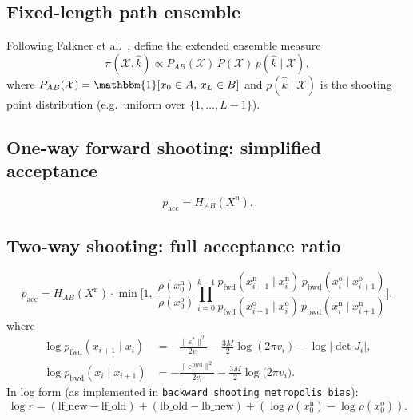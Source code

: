 \documentclass[11pt,a4paper]{article}
\newcommand{\HAB}{H_{AB}}
\newcommand{\pacc}{p_{\mathrm{acc}}}
\newcommand{\pfwd}{p_{\mathrm{fwd}}}
\newcommand{\pbwd}{p_{\mathrm{bwd}}}
\newcommand{\Xnew}{X^{\mathrm{n}}}
\begin{document}
\subsection{Fixed-length path ensemble}

Following Falkner et al.~\cite{falkner2023}, define the extended
ensemble measure
\begin{equation}
  \pi(\mathcal{X}, \hat k)
  \propto
  P_{AB}(\mathcal{X})\,P(\mathcal{X})\,p(\hat k \mid \mathcal{X}),
\end{equation}
where $P_{AB}(\mathcal{X}) = \mathbbm{1}[x_0 \in A,\, x_L \in B]$ and
$p(\hat k \mid \mathcal{X})$ is the shooting point distribution
(e.g.\ uniform over $\{1,\ldots,L-1\}$).

\subsection{One-way forward shooting: simplified acceptance}

\begin{equation}
  \pacc = \HAB(\Xnew).
  \label{eq:oneway-acceptance}
\end{equation}

\subsection{Two-way shooting: full acceptance ratio}

\begin{equation}
  \pacc = \HAB(\Xnew)\cdot
  \min\!\Biggl[1,\;
    \frac{\rho(x_0^{\mathrm{n}})}{\rho(x_0^{\mathrm{o}})}
    \prod_{i=0}^{k-1}
    \frac{\pfwd(x_{i+1}^{\mathrm{n}} \mid x_i^{\mathrm{n}})\,
          \pbwd(x_i^{\mathrm{o}} \mid x_{i+1}^{\mathrm{o}})}
         {\pfwd(x_{i+1}^{\mathrm{o}} \mid x_i^{\mathrm{o}})\,
          \pbwd(x_i^{\mathrm{n}} \mid x_{i+1}^{\mathrm{n}})}
  \Biggr],
  \label{eq:twoway-acceptance-full}
\end{equation}
where
\begin{align}
  \log\pfwd(x_{i+1}\mid x_i)
  &= -\frac{\|\varepsilon_i^*\|^2}{2v_i}
     - \frac{3M}{2}\log(2\pi v_i)
     - \log|\det J_i|,
  \label{eq:pfwd-logprob}\\
  \log\pbwd(x_i \mid x_{i+1})
  &= -\frac{\|\varepsilon_i^{\mathrm{bwd}}\|^2}{2v_i}
     - \frac{3M}{2}\log\bigl(2\pi v_i\bigr).
  \label{eq:pbwd-logprob}
\end{align}
In log form (as implemented in \texttt{backward\_shooting\_metropolis\_bias}):
\begin{equation}
  \log r
  = (\mathrm{lf\_new} - \mathrm{lf\_old})
  + (\mathrm{lb\_old} - \mathrm{lb\_new})
  + (\log\rho(x_0^{\mathrm{n}}) - \log\rho(x_0^{\mathrm{o}})).
  \label{eq:logr-implementation}
\end{equation}
\end{document}
